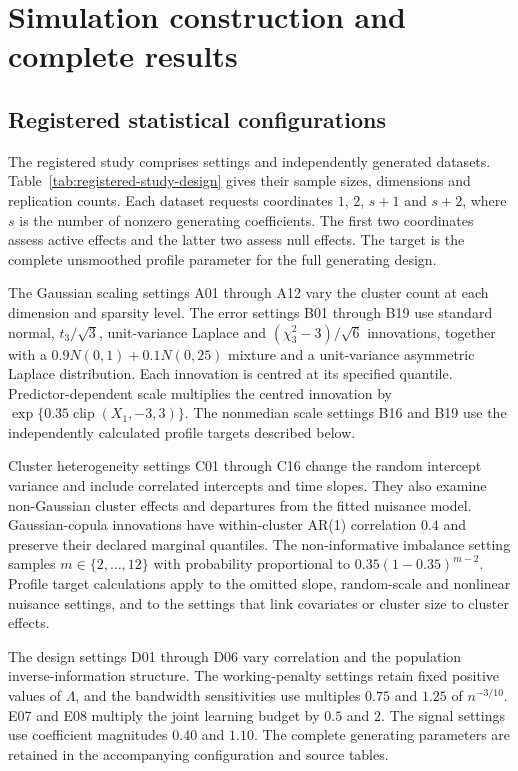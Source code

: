 \section{Simulation construction and complete results}\label{supp:simulation}



\subsection{Registered statistical configurations}\label{supp:registered-study}

The registered study comprises \RegisteredJointSettings{} settings
and \RegisteredJointDatasets{} independently generated datasets.
Table~\ref{tab:registered-study-design} gives their sample sizes,
dimensions and replication counts. Each dataset requests coordinates
$1$, $2$, $s+1$ and $s+2$, where $s$ is the number of nonzero
generating coefficients. The first two coordinates assess active
effects and the latter two assess null effects. The target is the
complete unsmoothed profile parameter for the full generating design.

The Gaussian scaling settings A01 through A12 vary the cluster count
at each dimension and sparsity level. The error settings B01 through
B19 use standard normal, $t_3/\sqrt{3}$, unit-variance Laplace and
$(\chi_3^2-3)/\sqrt{6}$ innovations, together with a
$0.9N(0,1)+0.1N(0,25)$ mixture and a unit-variance asymmetric Laplace
distribution. Each innovation is centred at its specified quantile.
Predictor-dependent scale multiplies the centred innovation by
$\exp\{0.35\operatorname{clip}(X_1,-3,3)\}$. The nonmedian
scale settings B16 and B19 use the independently calculated profile
targets described below.

Cluster heterogeneity settings C01 through C16 change the random
intercept variance and include correlated intercepts and time slopes.
They also examine non-Gaussian cluster effects and departures from
the fitted nuisance model. Gaussian-copula innovations have
within-cluster AR(1) correlation $0.4$ and preserve their declared
marginal quantiles. The non-informative imbalance setting samples
$m\in\{2,\ldots,12\}$ with probability proportional to
$0.35(1-0.35)^{m-2}$. Profile target calculations apply to the omitted
slope, random-scale and nonlinear nuisance settings, and to the
settings that link covariates or cluster size to cluster effects.

The design settings D01 through D06 vary correlation and the
population inverse-information structure. The working-penalty
settings retain fixed positive values of $\Lambda$, and the bandwidth
sensitivities use multiples $0.75$ and $1.25$ of $n^{-3/10}$.
E07 and E08 multiply the joint learning budget by $0.5$ and $2$.
The signal settings use coefficient magnitudes $0.40$ and $1.10$.
The complete generating parameters are retained in the accompanying
configuration and source tables.

